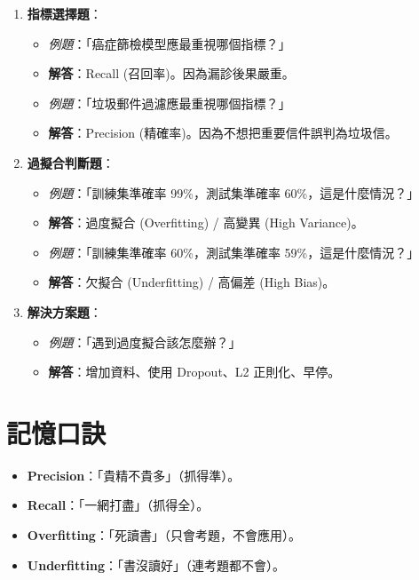 \documentclass[
  letterpaper,
  DIV=11,
  numbers=noendperiod]{scrreprt}
\providecommand{\tightlist}{%
  \setlength{\itemsep}{0pt}\setlength{\parskip}{0pt}}
\begin{document}
\begin{enumerate}
\def\labelenumi{\arabic{enumi}.}
\tightlist
\item
  \textbf{指標選擇題}：

  \begin{itemize}
  \tightlist
  \item
    \emph{例題}：「癌症篩檢模型應最重視哪個指標？」
  \item
    \textbf{解答}：Recall (召回率)。因為漏診後果嚴重。
  \item
    \emph{例題}：「垃圾郵件過濾應最重視哪個指標？」
  \item
    \textbf{解答}：Precision (精確率)。因為不想把重要信件誤判為垃圾信。
  \end{itemize}
\item
  \textbf{過擬合判斷題}：

  \begin{itemize}
  \tightlist
  \item
    \emph{例題}：「訓練集準確率 99\%，測試集準確率
    60\%，這是什麼情況？」
  \item
    \textbf{解答}：過度擬合 (Overfitting) / 高變異 (High Variance)。
  \item
    \emph{例題}：「訓練集準確率 60\%，測試集準確率
    59\%，這是什麼情況？」
  \item
    \textbf{解答}：欠擬合 (Underfitting) / 高偏差 (High Bias)。
  \end{itemize}
\item
  \textbf{解決方案題}：

  \begin{itemize}
  \tightlist
  \item
    \emph{例題}：「遇到過度擬合該怎麼辦？」
  \item
    \textbf{解答}：增加資料、使用 Dropout、L2 正則化、早停。
  \end{itemize}
\end{enumerate}

\section{記憶口訣}\label{ux8a18ux61b6ux53e3ux8a23-8}

\begin{itemize}
\tightlist
\item
  \textbf{Precision}：「貴精不貴多」（抓得準）。
\item
  \textbf{Recall}：「一網打盡」（抓得全）。
\item
  \textbf{Overfitting}：「死讀書」（只會考題，不會應用）。
\item
  \textbf{Underfitting}：「書沒讀好」（連考題都不會）。
\end{itemize}
\end{document}
